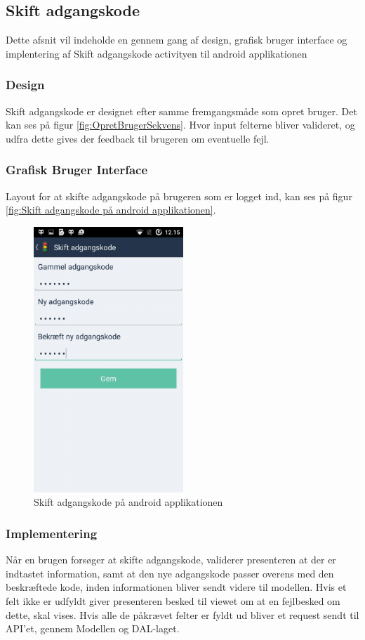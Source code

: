 	\subsection{Skift adgangskode}
	Dette afsnit vil indeholde en gennem gang af design, grafisk bruger interface og implentering af Skift adgangskode activityen til android applikationen
	
	\subsubsection{Design}
	Skift adgangskode er designet efter samme fremgangsmåde som opret bruger. Det kan ses på figur \vref{fig:OpretBrugerSekvens}. Hvor input felterne bliver valideret, og udfra dette gives der feedback til brugeren om eventuelle fejl. 
	
	\subsubsection{Grafisk Bruger Interface}
	Layout for at skifte adgangskode på brugeren som er logget ind, kan ses på figur \vref{fig:Skift adgangskode på android applikationen}.	
	\begin{figure} [!ht]
		\begin{center}
			\includegraphics[height=10cm]{Android/Billeder/AndroidSkiftAdgangskode}
		\end{center}
		\caption{Skift adgangskode på android applikationen}
		\label{fig:Skift adgangskode på android applikationen}
	\end{figure}
	
	\subsubsection{Implementering}
	Når en brugen forsøger at skifte adgangskode, validerer presenteren at der er indtastet information, samt at den nye adgangskode passer overens med den beskræftede kode, inden informationen bliver sendt videre til modellen. Hvis et felt ikke er udfyldt giver presenteren besked til viewet om at en fejlbesked om dette, skal vises. Hvis alle de påkrævet felter er fyldt ud bliver et request sendt til API'et, gennem Modellen og DAL-laget.
	
	\pagebreak